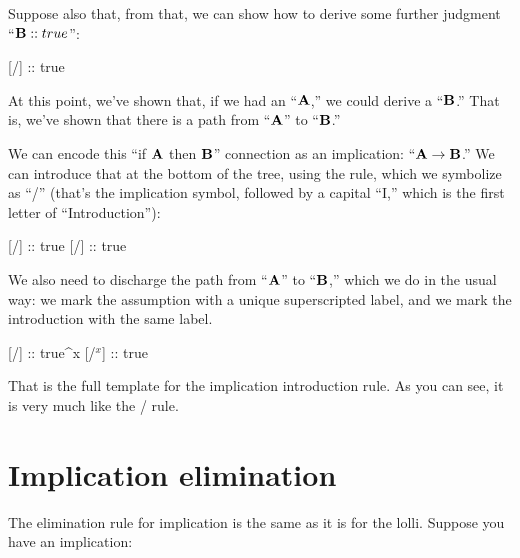 \documentclass[../../../main.tex]{subfiles}
\begin{document}
\noindent
Suppose also that, from that, we can show how to derive some further judgment ``$\mathbf{B} :: true$'':

\begin{prooftree*}
  \hypo{}
  [\startrule/]{ :: true}
\end{prooftree*}

\noindent
At this point, we've shown that, if we had an ``$\mathbf{A}$,'' we could derive a ``$\mathbf{B}$.'' That is, we've shown that there is a path from ``$\mathbf{A}$'' to ``$\mathbf{B}$.'' 

We can encode this ``if $\mathbf{A}$ then $\mathbf{B}$'' connection as an implication: ``$\nd{A \impl/ B}$.'' We can introduce that at the bottom of the tree, using the  rule, which we symbolize as ``\implIntro/'' (that's the implication symbol, followed by a capital ``I,'' which is the first letter of ``Introduction''):

\begin{prooftree*}
  \hypo{}
  [\startrule/]{ :: true}
  [\implIntro/]{ :: true}
\end{prooftree*}

\noindent
We also need to discharge the path from ``$\mathbf{A}$'' to ``$\mathbf{B}$,'' which we do in the usual way: we mark the assumption with a unique superscripted label, and we mark the introduction with the same label.

\begin{prooftree*}
  \hypo{}
  [\startrule/]{ :: true^{x}}
  [\implIntro/$^{x}$]{ :: true}
\end{prooftree*}

\noindent
That is the full template for the implication introduction rule. As you can see, it is very much like the \lolliIntro/ rule. 


\section{Implication elimination}

The elimination rule for implication is the same as it is for the lolli. Suppose you have an implication:

\begin{prooftree*}
  \hypo{}
\end{prooftree*}
\end{document}
